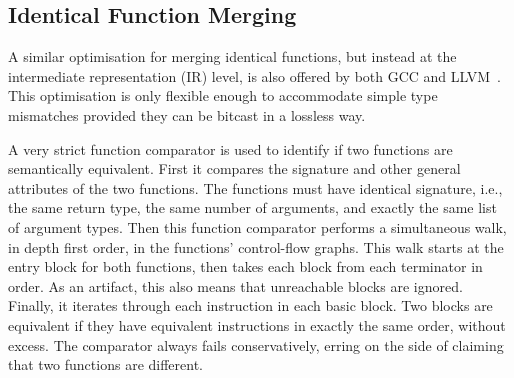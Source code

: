 
\subsection{Identical Function Merging}

A similar optimisation for merging identical functions, but instead at the
intermediate representation (IR) level, is also offered by both GCC and
LLVM~\cite{llvm-fm,livska14}.
This optimisation is only flexible enough to accommodate simple type mismatches
provided they can be bitcast in a lossless way.


A very strict function comparator is used to identify if two functions are 
semantically equivalent.
First it compares the signature and other general attributes of the two functions.
The functions must have identical signature, i.e., the same return type, the same
number of arguments, and exactly the same list of argument types.
Then this function comparator performs a simultaneous walk, in depth
first order, in the functions' control-flow graphs.
This walk starts at the entry block for both functions, then takes each block
from each terminator in order.
As an artifact, this also means that unreachable blocks are ignored.
Finally, it iterates through each instruction in each basic block.
Two blocks are equivalent if they have equivalent instructions in exactly the
same order, without excess.
The comparator always fails conservatively, erring on the side of claiming that
two functions are different.

